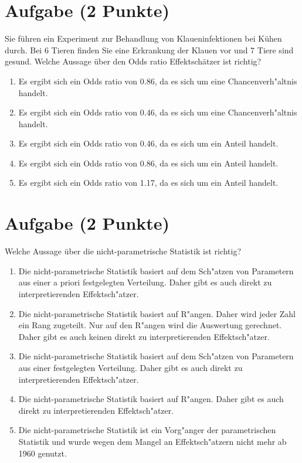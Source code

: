 \documentclass[a4paper, 10pt]{scrartcl}\usepackage[]{graphicx}\usepackage[]{xcolor}
\begin{document}
\section{Aufgabe \hfill (2 Punkte)}



Sie f{\"u}hren ein Experiment zur Behandlung von Klaueninfektionen bei K{\"u}hen
durch. Bei 6 Tieren finden Sie eine Erkrankung der Klauen vor und
7 Tiere sind gesund. Welche Aussage {\"u}ber den Odds ratio
Effektsch{\"a}tzer ist richtig?



\begin{enumerate}
\item [\textbf{A} \msquare] Es ergibt sich ein Odds ratio von 0.86, da es sich um eine Chancenverh{"a}ltnis handelt.
\item [\textbf{B} \msquare] Es ergibt sich ein Odds ratio von 0.46, da es sich um eine Chancenverh{"a}ltnis handelt.
\item [\textbf{C} \msquare] Es ergibt sich ein Odds ratio von 0.46, da es sich um ein Anteil handelt.
\item [\textbf{D} \msquare] Es ergibt sich ein Odds ratio von 0.86, da es sich um ein Anteil handelt.
\item [\textbf{E} \msquare] Es ergibt sich ein Odds ratio von 1.17, da es sich um ein Anteil handelt.
\end{enumerate}

\section{Aufgabe \hfill (2 Punkte)}




Welche Aussage {\"u}ber die nicht-parametrische Statistik ist richtig?



\begin{enumerate}
\item [\textbf{A} \msquare] Die nicht-parametrische Statistik basiert auf dem Sch{"a}tzen von Parametern aus einer a priori festgelegten Verteilung. Daher gibt es auch direkt zu interpretierenden Effektsch{"a}tzer.
\item [\textbf{B} \msquare] Die nicht-parametrische Statistik basiert auf R{"a}ngen. Daher wird jeder Zahl ein Rang zugeteilt. Nur auf den R{"a}ngen wird die Auswertung gerechnet. Daher gibt es auch keinen direkt zu interpretierenden Effektsch{"a}tzer.
\item [\textbf{C} \msquare] Die nicht-parametrische Statistik basiert auf dem Sch{"a}tzen von Parametern aus einer festgelegten Verteilung. Daher gibt es auch direkt zu interpretierenden Effektsch{"a}tzer.
\item [\textbf{D} \msquare] Die nicht-parametrische Statistik basiert auf R{"a}ngen. Daher gibt es auch direkt zu interpretierenden Effektsch{"a}tzer.
\item [\textbf{E} \msquare] Die nicht-parametrische Statistik ist ein Vorg{"a}nger der parametrischen Statistik und wurde wegen dem Mangel an Effektsch{"a}tzern nicht mehr ab 1960 genutzt.
\end{enumerate}
\end{document}
